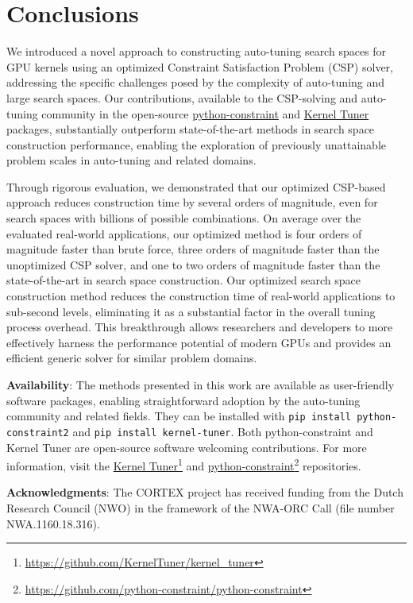 \section{Conclusions}
\label{sec:conclusion_futurework}

We introduced a novel approach to constructing auto-tuning search spaces for GPU kernels using an optimized Constraint Satisfaction Problem (CSP) solver, addressing the specific challenges posed by the complexity of auto-tuning and large search spaces. 
Our contributions, available to the CSP-solving and auto-tuning community in the open-source \href{https://pypi.org/project/python-constraint2/}{python-constraint} and \href{https://pypi.org/project/kernel-tuner/}{Kernel Tuner} packages, substantially outperform state-of-the-art methods in search space construction performance, enabling the exploration of previously unattainable problem scales in auto-tuning and related domains.

Through rigorous evaluation, we demonstrated that our optimized CSP-based approach reduces construction time by several orders of magnitude, even for search spaces with billions of possible combinations. 
On average over the evaluated real-world applications, our optimized method is four orders of magnitude faster than brute force, three orders of magnitude faster than the unoptimized CSP solver, and one to two orders of magnitude faster than the state-of-the-art in search space construction. 
Our optimized search space construction method reduces the construction time of real-world applications to sub-second levels, eliminating it as a substantial factor in the overall tuning process overhead. %
This breakthrough allows researchers and developers to more effectively harness the performance potential of modern GPUs and provides an efficient generic solver for similar problem domains.

\textbf{Availability}: The methods presented in this work are available as user-friendly software packages, enabling straightforward adoption by the auto-tuning community and related fields. 
They can be installed with \lstinline{pip install python-constraint2} and \lstinline{pip install kernel-tuner}. 
Both python-constraint and Kernel Tuner are open-source software welcoming contributions. 
For more information, visit the \href{https://github.com/KernelTuner/kernel_tuner}{Kernel Tuner}\footnote{\url{https://github.com/KernelTuner/kernel_tuner}} and \href{https://github.com/python-constraint/python-constraint}{python-constraint}\footnote{\url{https://github.com/python-constraint/python-constraint}} repositories. 

\ifdoubleblind
\else
\textbf{Acknowledgments}: The CORTEX project has received funding from the Dutch Research Council (NWO) in the framework of the NWA-ORC Call (file number NWA.1160.18.316).
\fi

